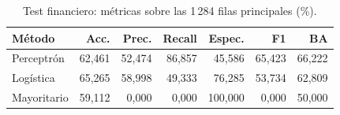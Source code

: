 \begin{table}[htbp]
\centering\small
\caption{Test financiero: métricas sobre las 1\,284 filas principales (\%).}\label{tab:tf-test}
\begin{tabular}{lrrrrrr}\toprule
Método & Acc. & Prec. & Recall & Espec. & F1 & BA \\ \midrule
Perceptrón & 62,461 & 52,474 & 86,857 & 45,586 & 65,423 & 66,222 \\
Logística & 65,265 & 58,998 & 49,333 & 76,285 & 53,734 & 62,809 \\
Mayoritario & 59,112 & 0,000 & 0,000 & 100,000 & 0,000 & 50,000 \\
\bottomrule\end{tabular}
\end{table}
